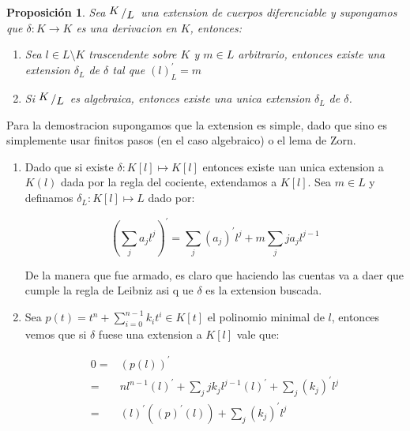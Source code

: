 \documentclass[11pt]{article}
\newcommand{\quotient}[2]{{\raisebox{.2em}{$#1$}\left/\raisebox{-.2em}{$#2$}\right.}}
\newcommand{\derivation}[1]{\left(#1\right)^\prime}
\numberwithin{theorem}{subsection}
\newtheorem{proposition}[theorem]{Proposici\'on}
\newenvironment{proof}[1][Demostraci\'on]{\begin{trivlist}
		\item[\hskip \labelsep {\bfseries #1}]}{\end{trivlist}}
\begin{document}
\begin{proposition}
	Sea $\quotient{K}{L}$ una extension de cuerpos diferenciable y supongamos que $\delta: K \rightarrow K$ es una derivacion en $K$, entonces:
	
	\begin{enumerate}
		\item Sea $l \in L \setminus K$ trascendente sobre $K$ y $m \in L$ arbitrario, entonces existe una extension $\delta_L$ de $\delta$ tal que $\derivation{l}_L = m$
		\item Si $\quotient{K}{L}$ es algebraica, entonces existe una unica extension $\delta_L$ de $\delta$.
	\end{enumerate}
	
\end{proposition}

\begin{proof}
	Para la demostracion supongamos que la extension es simple, dado que sino es simplemente usar finitos pasos (en el caso algebraico) o el lema de Zorn.
	
	\begin{enumerate}
		\item [$l$ trascendente]
		
		Dado que si existe $\delta : K[l] \mapsto K[l]$ entonces existe uan unica extension a $K(l)$ dada por la regla del cociente, extendamos a $K[l]$. Sea $m \in L$ y definamos $\delta_L: K[l] \mapsto L$ dado por:
		
		\begin{equation}
			\derivation{\sum\limits_j a_jl^j} = \sum\limits_j \derivation{a_j}l^j + m \sum\limits_j j a_j l^{j-1}
		\end{equation}
		
		De la manera que fue armado, es claro que haciendo las cuentas va a daer que cumple la regla de Leibniz asi q	ue $\delta$ es la extension buscada.
		
		\item[$\quotient{K}{K[l]}$ es algebraica]
		
		Sea $p(t) = t^n + \sum\limits_{i=0}^{n-1} k_it^i \in K[t]$ el polinomio minimal de $l$, entonces vemos que si $\delta$ fuese una extension a $K[l]$ vale que:
		
		\begin{equation}
			\begin{aligned}
				0 = & \derivation{p(l)} \\
				=& nl^{n-1}\derivation{l} + \sum\limits_j j k_j l^{j-1} \derivation{l} + \sum\limits_j \derivation{k_j}l^j \\
				= & \derivation{l} \left( \derivation{p}(l)\right) + \sum\limits_j \derivation{k_j}l^j
			\end{aligned}
		\end{equation}
		

\end{enumerate}
\end{proof}
\end{document}
